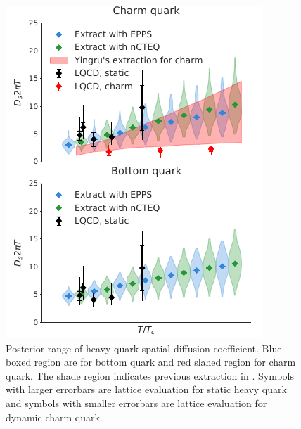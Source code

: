 \documentclass[aps, prc, reprint, amsmath, groupedaddress, nofootinbib]{revtex4-1}
\begin{document}
\begin{figure}
\includegraphics[width=\columnwidth]{Ds_posterior.pdf}
\caption{Posterior range of heavy quark spatial diffusion coefficient. Blue boxed region are for bottom quark and red slahed region for charm quark. The shade region indicates previous extraction in \cite{Xu:2017obm}. Symbols with larger errorbars are lattice evaluation for static heavy quark and symbols with smaller errorbars are lattice evaluation for dynamic charm quark.}\label{plots:posterior_Ds}
\end{figure}
\end{document}
